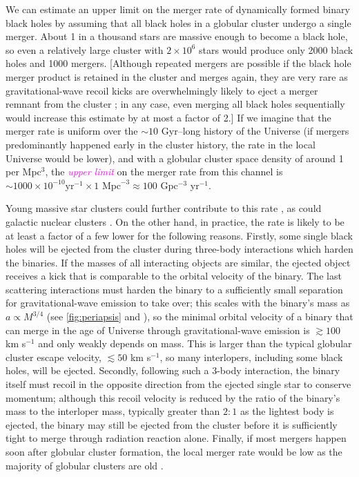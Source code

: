 \documentclass[iop,onecolumn]{revtex4}
\newcommand{\ilya}[1]{\textcolor{magenta}{#1}}
\begin{document}
We can estimate an upper limit on the merger rate of dynamically formed binary black holes by assuming that all black holes in a globular cluster undergo a single merger.  About 1 in a thousand stars are massive enough to become a black hole, so even a relatively large cluster with $2\times 10^6$ stars would produce only 2000 black holes and 1000 mergers.  [Although repeated mergers are possible if the black hole merger product is retained in the cluster and merges again, they are very rare as gravitational-wave recoil kicks are overwhelmingly likely to eject a merger remnant from the cluster \citep{Rodriguez:2018}; in any case, even merging all black holes sequentially would increase this estimate by at most a factor of 2.]  If we imagine that the merger rate is uniform over the $\sim 10$ Gyr--long history of the Universe (if mergers predominantly happened early in the cluster history, the rate in the local Universe would be lower), and with a globular cluster space density of around 1 per Mpc$^3$, the \ilya{\it upper limit} on the merger rate from this channel is $\sim 1000 \times 10^{-10} \textrm{yr}^{-1} \times 1 \textrm{ Mpc}^{-3} \approx 100$ Gpc$^{-3}$ yr$^{-1}$.

Young massive star clusters could further contribute to this rate \citep[e.g.,][]{Ziosi:2014}, as could galactic nuclear clusters \citep[e.g.,][]{MillerLauburg:2008,Bartos:2016,Stone:2016,AntoniniRasio:2016}.  On the other hand, in practice, the rate is likely to be at least a factor of a few lower for the following reasons.  Firstly, some single black holes will be ejected from the cluster during three-body interactions which harden the binaries.  If the masses of all interacting objects are similar, the ejected object receives a kick that is comparable to the orbital velocity of the binary.  The last scattering interactions must harden the binary to a sufficiently small separation for gravitational-wave emission to take over; this scales with the binary's mass as $a \propto M^{3/4}$ (see \autoref{fig:periapsis} and \citet{Peters:1964}), so the minimal orbital velocity of a binary that can merge in the age of Universe through gravitational-wave emission is $\gtrsim 100$ km s$^{-1}$ and only weakly depends on mass.   This is larger than the typical globular cluster escape velocity, $\lesssim 50$ km s$^{-1}$, so many interlopers, including some black holes, will be ejected.  Secondly, following such a 3-body interaction, the binary itself must recoil in the opposite direction from the ejected single star to conserve momentum; although this recoil velocity is reduced by the ratio of the binary's mass to the interloper mass, typically greater than $2:1$ as the lightest body is ejected, the binary may still be ejected from the cluster before it is sufficiently tight to merge through radiation reaction alone. Finally, if most mergers happen soon after globular cluster formation, the local merger rate would be low as the majority of globular clusters are old \citep{Rodriguez:2016big}.
\end{document}
